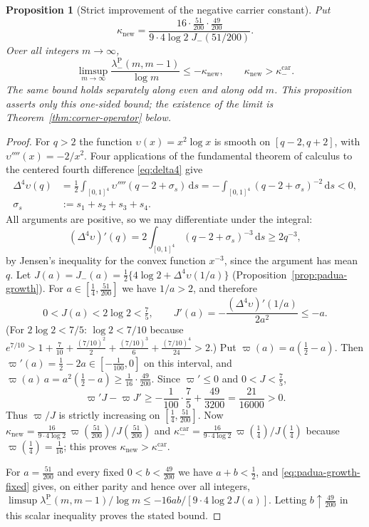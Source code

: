 \documentclass[preprint,12pt,a4paper]{elsarticle}
\newtheorem{proposition}[theorem]{Proposition}
\theoremstyle{remark}
\newcommand{\Pa}{\mathrm P}
\newcommand{\dd}{\,\mathrm d}
\begin{document}
\begin{proposition}[Strict improvement of the negative carrier constant]\label{prop:carrier-improvement}
Put
\[
 \kappa_{\mathrm{new}}=\frac{16\cdot\frac{51}{200}\cdot\frac{49}{200}}
   {9\cdot4\log2\;J_-(51/200)}.
\]
Over all integers $m\to\infty$,
\[
 \limsup_{m\to\infty}\frac{\lambda^\Pa_-(m,m-1)}{\log m}
 \le-\kappa_{\mathrm{new}},\qquad
 \kappa_{\mathrm{new}}>\kappa^{\mathrm{car}}_-.
\]
The same bound holds separately along even and along odd $m$.
This proposition asserts only this one-sided bound; the existence of
the limit is Theorem~\ref{thm:corner-operator} below.
\end{proposition}
\begin{proof}
For $q>2$ the function $\upsilon(x)=x^2\log x$ is smooth on $[q-2,q+2]$, with
$\upsilon''''(x)=-2/x^2$. Four applications of the fundamental theorem of
calculus to the centered fourth difference \eqref{eq:delta4} give
\begin{align*}
 \Delta^4\upsilon(q)&=\tfrac12\int_{[0,1]^4}\upsilon''''(q-2+\sigma_s)\dd s
 =-\int_{[0,1]^4}(q-2+\sigma_s)^{-2}\dd s<0,\\
 \sigma_s&:=s_1+s_2+s_3+s_4 .
\end{align*}
All arguments are positive, so we may differentiate under the integral:
\[
 (\Delta^4\upsilon)'(q)=2\int_{[0,1]^4}(q-2+\sigma_s)^{-3}\dd s\ge2q^{-3},
\]
by Jensen's inequality for the convex function $x^{-3}$, since the
argument has mean $q$. Let $J(a)=J_-(a)=\frac12\{4\log2+\Delta^4\upsilon(1/a)\}$
(Proposition~\ref{prop:padua-growth}). For $a\in[\frac14,\frac{51}{200}]$ we
have $1/a>2$, and therefore
\[
 0<J(a)<2\log2<\tfrac75,\qquad
 J'(a)=-\frac{(\Delta^4\upsilon)'(1/a)}{2a^2}\le-a.
\]
(For $2\log2<7/5$: $\log2<7/10$ because $e^{7/10}>1+\frac7{10}+\frac{(7/10)^2}2
+\frac{(7/10)^3}6+\frac{(7/10)^4}{24}>2$.)
Put $\varpi(a)=a(\frac12-a)$. Then $\varpi'(a)=\frac12-2a\in[-\frac1{100},0]$
on this interval, and $\varpi(a)\,a=a^2(\frac12-a)\ge\frac1{16}\cdot\frac{49}{200}$.
Since $\varpi'\le0$ and $0<J<\frac75$,
\[
 \varpi'J-\varpi J'\ge-\frac1{100}\cdot\frac75+\frac{49}{3200}
 =\frac{21}{16000}>0 .
\]
Thus $\varpi/J$ is strictly increasing on $[\frac14,\frac{51}{200}]$. Now
$\kappa_{\mathrm{new}}=\frac{16}{9\cdot4\log2}\,\varpi(\frac{51}{200})/J(\frac{51}{200})$
and $\kappa^{\mathrm{car}}_-=\frac{16}{9\cdot4\log2}\,\varpi(\frac14)/J(\frac14)$
because $\varpi(\frac14)=\frac1{16}$; this proves
$\kappa_{\mathrm{new}}>\kappa^{\mathrm{car}}_-$.

For $a=\frac{51}{200}$ and every fixed $0<b<\frac{49}{200}$ we have
$a+b<\frac12$, and \eqref{eq:padua-growth-fixed} gives, on either parity
and hence over all integers,
$\limsup\lambda^\Pa_-(m,m-1)/\log m\le-16ab/[9\cdot4\log2\,J(a)]$.
Letting $b\uparrow\frac{49}{200}$ in this scalar inequality proves the
stated bound.
\end{proof}
\end{document}
